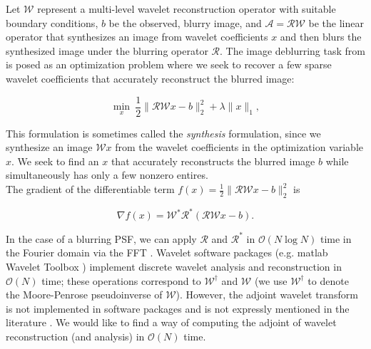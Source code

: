 \documentclass[journal]{IEEEtran}
\begin{document}
Let $\mathcal{W}$ represent a multi-level wavelet reconstruction operator with suitable boundary conditions, $b$ be the observed, blurry image, and $\mathcal{A}=\mathcal{RW}$ be the linear operator that synthesizes an image from wavelet coefficients $x$ and then blurs the synthesized image under the blurring operator $\mathcal{R}$.  The image deblurring task from \cite{beck_2009} is posed as an optimization problem where we seek to recover a few sparse wavelet coefficients that accurately reconstruct the blurred image:

\begin{equation}
\label{eq:syn_problem}
\min_x~ \dfrac{1}{2}\|\mathcal{RW}x-b\|_2^2 + \lambda \|x\|_1,
\end{equation}

\noindent This formulation is sometimes called the \emph{synthesis} formulation, since we synthesize an image $\mathcal{W}x$ from the wavelet coefficients in the optimization variable $x$.  We seek to find an $x$ that accurately reconstructs the blurred image $b$ while simultaneously has only a few nonzero entires.\\

The gradient of the differentiable term $f(x)={\frac{1}{2}\|\mathcal{RW}x-b\|_2^2}$ is

\[ \nabla f(x) = \mathcal{W}^\ast \mathcal{R}^\ast(\mathcal{RW}x-b). \] 

\noindent In the case of a blurring PSF, we can apply $\mathcal{R}$ and $\mathcal{R}^\ast$ in $\mathcal{O}(N\log N)$ time in the Fourier domain via the FFT \cite{beck_2009, hansen_2006}.  Wavelet software packages (e.g. {\sc matlab} Wavelet Toolbox \cite{matlab_wt_2015}) implement discrete wavelet analysis and reconstruction in $\mathcal{O}(N)$ time; these operations correspond to $\mathcal{W}^\dagger$ and $\mathcal{W}$ (we use $\mathcal{W}^\dagger$ to denote the Moore-Penrose pseudoinverse of $\mathcal{W}$).  However, the adjoint wavelet transform is not implemented in software packages and is not expressly mentioned in the literature \cite{mallat_2009, daubechies_1992, strang_1996}.  We would like to find a way of computing the adjoint of wavelet reconstruction (and analysis) in $\mathcal{O}(N)$ time.\\
\end{document}
